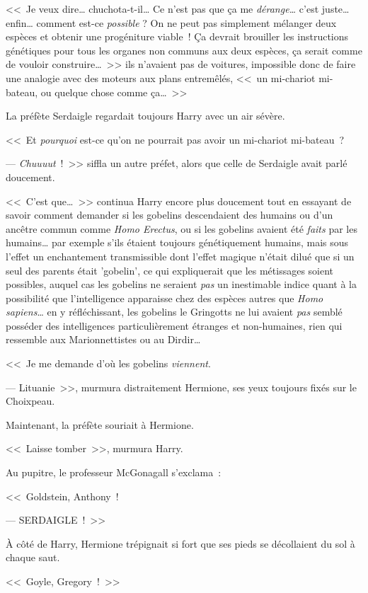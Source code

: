 <<~Je veux dire… chuchota-t-il… Ce n'est pas que ça me \emph{dérange…} c'est juste… enfin… comment est-ce \emph{possible} ? On ne peut pas simplement mélanger deux espèces et obtenir une progéniture viable~! Ça devrait brouiller les instructions génétiques pour tous les organes non communs aux deux espèces, ça serait comme de vouloir construire…~>> ils n'avaient pas de voitures, impossible donc de faire une analogie avec des moteurs aux plans entremêlés, <<~un mi-chariot mi-bateau, ou quelque chose comme ça…~>>

La préfète Serdaigle regardait toujours Harry avec un air sévère.

<<~Et \emph{pourquoi} est-ce qu'on ne pourrait pas avoir un mi-chariot mi-bateau~?

--- \emph{Chuuuut}~!~>> siffla un autre préfet, alors que celle de Serdaigle avait parlé doucement.

<<~C'est que…~>> continua Harry encore plus doucement tout en essayant de savoir comment demander si les gobelins descendaient des humains ou d'un ancêtre commun comme \emph{Homo Erectus}, ou si les gobelins avaient été \emph{faits} par les humains… par exemple s'ils étaient toujours génétiquement humains, mais sous l'effet un enchantement transmissible dont l'effet magique n'était dilué que si un seul des parents était 'gobelin', ce qui expliquerait que les métissages soient possibles, auquel cas les gobelins ne seraient \emph{pas} un inestimable indice quant à la possibilité que l'intelligence apparaisse chez des espèces autres que \emph{Homo sapiens}… en y réfléchissant, les gobelins le Gringotts ne lui avaient \emph{pas} semblé posséder des intelligences particulièrement étranges et non-humaines, rien qui ressemble aux Marionnettistes ou au Dirdir…

<<~Je me demande d'où les gobelins \emph{viennent}.

--- Lituanie~>>, murmura distraitement Hermione, ses yeux toujours fixés sur le Choixpeau.

Maintenant, la préfète souriait à Hermione.

<<~Laisse tomber~>>, murmura Harry.

Au pupitre, le professeur McGonagall s'exclama~:

<<~Goldstein, Anthony~!

--- SERDAIGLE~!~>>

À côté de Harry, Hermione trépignait si fort que ses pieds se décollaient du sol à chaque saut.

<<~Goyle, Gregory~!~>>

